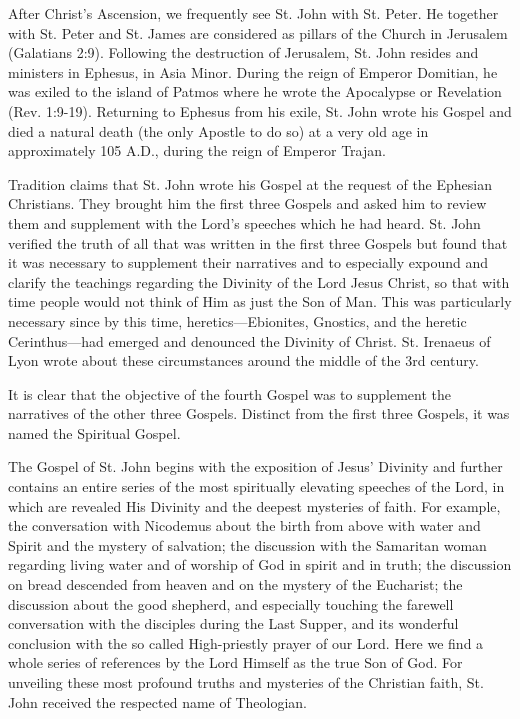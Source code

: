 After Christ's Ascension, we frequently see St. John with St. Peter. He together with St. Peter and St. James are considered as pillars of the Church in Jerusalem (Galatians 2:9). Following the destruction of Jerusalem, St. John resides and ministers in Ephesus, in Asia Minor. During the reign of Emperor Domitian, he was exiled to the island of Patmos where he wrote the Apocalypse or Revelation (Rev. 1:9-19). Returning to Ephesus from his exile, St. John wrote his Gospel and died a natural death (the only Apostle to do so) at a very old age in approximately 105 A.D., during the reign of Emperor Trajan.

Tradition claims that St. John wrote his Gospel at the request of the Ephesian Christians. They brought him the first three Gospels and asked him to review them and supplement with the Lord's speeches which he had heard. St. John verified the truth of all that was written in the first three Gospels but found that it was necessary to supplement their narratives and to especially expound and clarify the teachings regarding the Divinity of the Lord Jesus Christ, so that with time people would not think of Him as just the Son of Man. This was particularly necessary since by this time, heretics---Ebionites, Gnostics, and the heretic Cerinthus---had emerged and denounced the Divinity of Christ. St. Irenaeus of Lyon wrote about these circumstances around the middle of the 3rd century.

It is clear that the objective of the fourth Gospel was to supplement the narratives of the other three Gospels.	Distinct from the first three Gospels, it was named the Spiritual Gospel.

The Gospel of St. John begins with the exposition of Jesus' Divinity and further contains an entire series of the most spiritually elevating speeches of the Lord, in which are revealed His Divinity and the deepest mysteries of faith. For example, the conversation with Nicodemus about the birth from above with water and Spirit and the mystery of salvation; the discussion with the Samaritan woman regarding living water and of worship of God in spirit and in truth; the discussion on bread descended from heaven and on the mystery of the Eucharist; the discussion about the good shepherd, and especially touching the farewell conversation with the disciples during the Last Supper, and its wonderful conclusion with the so called High-priestly prayer of our Lord. Here we find a whole series of references by the Lord Himself as the true Son of God. For unveiling these most profound truths and mysteries of the Christian faith, St. John received the respected name of Theologian.

